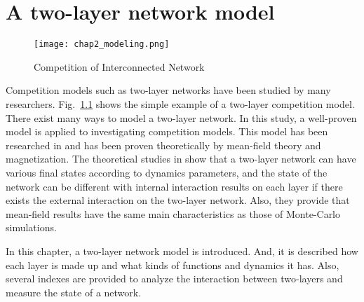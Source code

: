 
\chapter{A two-layer network model}
\label{chap2}

\begin{figure}[!htb]
	\centering
	\texttt{[image: chap2\_modeling.png]}
	\caption{Competition of Interconnected Network}
	\label{chap2_modeling}
\end{figure}

Competition models such as two-layer networks have been studied by many researchers. Fig.~\ref{chap2_modeling}  shows the simple example of a two-layer competition model. There exist many ways to model a two-layer network. In this study, a well-proven model is applied to investigating competition models. This model has been researched in \parencite{diep2017, alvarez2016, gomez2015} and has been proven theoretically by mean-field theory and magnetization\parencite{amato2017, diep2017, alvarez2016, gomez2015}. The theoretical studies in \parencite{diep2017, alvarez2016, gomez2015} show that a two-layer network can have various final states according to dynamics parameters, and the state of the network can be different with internal interaction results on each layer if there exists the external interaction on the two-layer network. Also, they provide that mean-field results have the same main characteristics as those of Monte-Carlo simulations.

In this chapter, a two-layer network model is introduced. And, it is described how each layer is made up and what kinds of functions and dynamics it has. Also, several indexes are provided to analyze the interaction between two-layers and measure the state of a network. 
 
